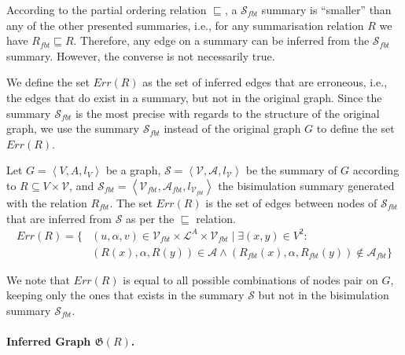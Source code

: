 According to the partial ordering relation $\sqsubseteq$, a $\mathcal{S}_{fbt}$ summary is ``smaller'' than any of the other presented summaries, i.e., for any summarisation relation $R$ we have $R_{fbt} \sqsubseteq R$. Therefore, any edge on a summary can be inferred from the $\mathcal{S}_{fbt}$ summary. However, the converse is not necessarily true.

We define the set $Err(R)$ as the set of inferred edges that are erroneous, i.e., the edges that do exist in a summary, but not in the original graph. Since the summary $\mathcal{S}_{fbt}$ is the most precise with regards to the structure of the original graph, we use the summary $\mathcal{S}_{fbt}$ instead of the original graph $G$ to define the set $Err(R)$.

\begin{definition}
Let $G=\left\langle V, A, l_V \right\rangle$ be a graph, $\mathcal{S} = \left\langle \mathcal{V}, \mathcal{A}, l_{\mathcal{V}} \right\rangle$ be the summary of $G$ according to $R \subseteq V \times \mathcal{V}$, and $\mathcal{S}_{fbt} = \left\langle \mathcal{V}_{fbt}, \mathcal{A}_{fbt}, l_{\mathcal{V}_{fbt}} \right\rangle$ the bisimulation summary generated with the relation $R_{fbt}$.
The set $Err(R)$ is the set of edges between nodes of $\mathcal{S}_{fbt}$ that are inferred from $\mathcal{S}$ as per the $\sqsubseteq$ relation.
\begin{equation*}
\begin{split}
Err(R) = \{ & (u, \alpha, v) \in \mathcal{V}_{fbt} \times \mathcal{L}^A \times \mathcal{V}_{fbt} \mid \exists (x, y) \in V^2 :\\
 & (R(x), \alpha, R(y)) \in \mathcal{A} \wedge (R_{fbt}(x), \alpha, R_{fbt}(y)) \not \in \mathcal{A}_{fbt} \}
\end{split}
\end{equation*}
\end{definition}

We note that $Err(R)$ is equal to all possible combinations of nodes pair on $G$, keeping only the ones that exists in the summary $\mathcal{S}$ but not in the bisimulation summary $\mathcal{S}_{fbt}$.

\paragraph{Inferred Graph $\mathfrak{G}(R)$.}

